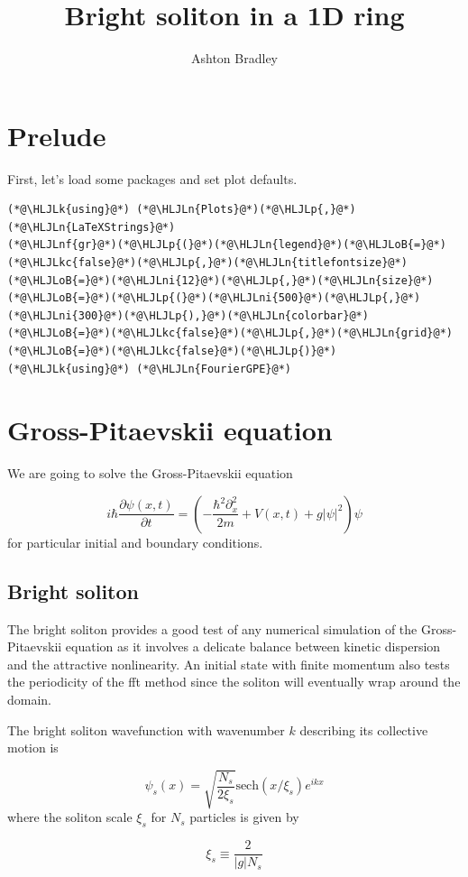 \documentclass[12pt,a4paper]{article}
\title{ Bright soliton in a 1D ring }
\author{ Ashton Bradley }
\newcommand{\HLJLk}[1]{\textcolor[RGB]{148,91,176}{\textbf{#1}}}
\newcommand{\HLJLkc}[1]{\textcolor[RGB]{59,151,46}{\textit{#1}}}
\newcommand{\HLJLn}[1]{#1}
\newcommand{\HLJLnf}[1]{\textcolor[RGB]{66,102,213}{#1}}
\newcommand{\HLJLni}[1]{\textcolor[RGB]{59,151,46}{#1}}
\newcommand{\HLJLoB}[1]{\textcolor[RGB]{102,102,102}{\textbf{#1}}}
\newcommand{\HLJLp}[1]{#1}
\begin{document}
\maketitle

\section{Prelude}
First, let's load some packages and set plot defaults.


\begin{lstlisting}
(*@\HLJLk{using}@*) (*@\HLJLn{Plots}@*)(*@\HLJLp{,}@*) (*@\HLJLn{LaTeXStrings}@*)
(*@\HLJLnf{gr}@*)(*@\HLJLp{(}@*)(*@\HLJLn{legend}@*)(*@\HLJLoB{=}@*)(*@\HLJLkc{false}@*)(*@\HLJLp{,}@*)(*@\HLJLn{titlefontsize}@*)(*@\HLJLoB{=}@*)(*@\HLJLni{12}@*)(*@\HLJLp{,}@*)(*@\HLJLn{size}@*)(*@\HLJLoB{=}@*)(*@\HLJLp{(}@*)(*@\HLJLni{500}@*)(*@\HLJLp{,}@*)(*@\HLJLni{300}@*)(*@\HLJLp{),}@*)(*@\HLJLn{colorbar}@*)(*@\HLJLoB{=}@*)(*@\HLJLkc{false}@*)(*@\HLJLp{,}@*)(*@\HLJLn{grid}@*)(*@\HLJLoB{=}@*)(*@\HLJLkc{false}@*)(*@\HLJLp{)}@*)
(*@\HLJLk{using}@*) (*@\HLJLn{FourierGPE}@*)
\end{lstlisting}


\section{Gross-Pitaevskii equation}
We are going to solve the Gross-Pitaevskii equation

\[
i\hbar\frac{\partial \psi(x,t)}{\partial t}=\left(-\frac{\hbar^2\partial_x^2}{2m}+V(x,t)+g|\psi|^2\right)\psi
\]
for particular initial and boundary conditions.

\subsection{Bright soliton}
The bright soliton provides a good test of any numerical simulation of the Gross-Pitaevskii equation as it involves a delicate balance between kinetic dispersion and the attractive nonlinearity. An initial state with finite momentum also tests the periodicity of the fft method since the soliton will eventually wrap around the domain.

The bright soliton wavefunction with wavenumber $k$ describing its collective motion is

\[
\psi_s(x)= \sqrt{\frac{N_s}{2\xi_s}}\textrm{sech}(x/\xi_s)e^{ikx}
\]
where the soliton scale $\xi_s$ for $N_s$ particles is given by

\[
\xi_s \equiv \frac{2}{|g|N_s}
\]
\end{document}
